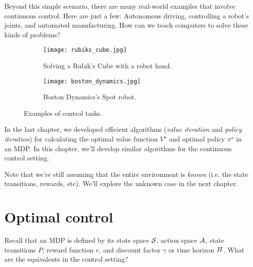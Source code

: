 \documentclass[\main/main]{subfiles}
\begin{document}
Beyond this simple scenario, there are many real-world examples that involve continuous control. Here are just a few:
Autonomous driving, controlling a robot's joints, and automated manufacturing.
How can we teach computers to solve these kinds of problems?

\begin{figure}[h]
    \centering
    \begin{subfigure}[b]{0.45\textwidth}
        \texttt{[image: rubiks\_cube.jpg]}
        \caption{Solving a Rubik's Cube with a robot hand.}
        \label{fig:rubik\st_cube}
    \end{subfigure}
    \hfill
    \begin{subfigure}[b]{0.45\textwidth}
        \texttt{[image: boston\_dynamics.jpg]}
        \caption{Boston Dynamics's Spot robot.}
        \label{fig:robot_hand}
    \end{subfigure}
    \caption{Examples of control tasks.}
    \label{fig:control_examples}
\end{figure}

In the last chapter, we developed efficient algorithms (\emph{value iteration} and \emph{policy iteration})
for calculating the optimal value function $V^\star$ and optimal policy $\pi^\star$ in an MDP.
In this chapter, we'll develop similar algorithms for the continuous control setting.

Note that we're still assuming that the entire environment is \emph{known} (i.e. the state transitions, rewards, etc). We'll explore the unknown case in the next chapter.

\section{Optimal control}

Recall that an MDP is defined by its state space $\S$, action space $\A$, state transitions $P$, reward function $r$, and discount factor $\gamma$ or time horizon $\hor$. What are the equivalents in the control setting?
\end{document}
